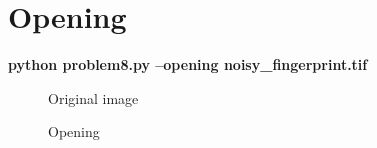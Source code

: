 \pagebreak

\section{Opening}

\textbf{python problem8.py --opening noisy\_fingerprint.tif}

\begin{figure}[!htb]\centering
    \begin{minipage}{0.45\textwidth}
        \caption{\small{Original image}}
    \end{minipage}
    \begin{minipage}{0.45\textwidth}
        \caption{\small{Opening}}\label{diagram:opening}
    \end{minipage}
\end{figure}


